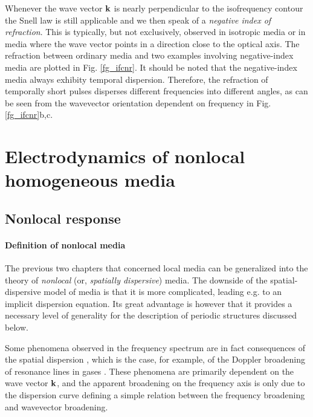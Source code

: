 Whenever the wave vector ${\mathbf{k}}$ is nearly perpendicular to the isofrequency contour the Snell law is still applicable and we then speak of a \textit{negative index of refraction}. 
This is typically, but not exclusively, observed in isotropic media or in media where the wave vector points in a direction close to the optical axis.
The refraction between ordinary media and two examples involving negative-index media are plotted in Fig. \ref{fg_ifcnr}. It should be noted that the negative-index media always exhibity temporal dispersion. Therefore, the refraction of temporally short pulses disperses different frequencies into different angles, as can be seen from the wavevector orientation dependent on frequency in Fig. \ref{fg_ifcnr}b,c.

\section{Electrodynamics of nonlocal homogeneous media} %
\label{chap_nonloc}
\subsection{Nonlocal response} 
\paragraph{Definition of nonlocal media}%
The previous two chapters that concerned local media can be generalized into the theory of \textit{nonlocal} (or, \textit{spatially dispersive}) media.  The downside of the spatial-dispersive model of media is that it is more complicated, leading e.g. to an implicit dispersion equation. Its great advantage is however that it provides a necessary level of generality for the description of periodic structures discussed below. 

Some phenomena observed in the frequency spectrum are in fact consequences of the spatial dispersion \cite[p. 359]{landau1984electrodynamics}, which is the case, for example, of the Doppler broadening of resonance lines in gases \cite{makarov2004permittivity}. These phenomena are primarily dependent on the wave vector ${\mathbf{k}}$, and the apparent broadening on the frequency axis is only due to the dispersion curve defining a simple relation between the frequency broadening and wavevector broadening.  

